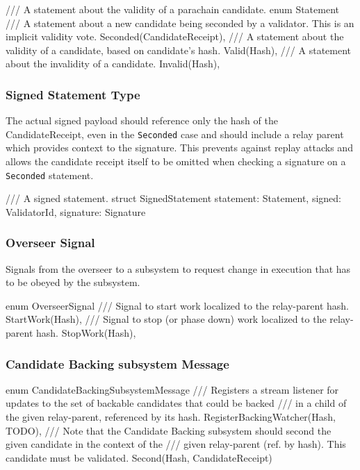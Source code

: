 \begin{verbnobox}[\small]
/// A statement about the validity of a parachain candidate.
enum Statement {
  /// A statement about a new candidate being seconded by a validator. This is an implicit validity vote.
  Seconded(CandidateReceipt),
  /// A statement about the validity of a candidate, based on candidate's hash.
  Valid(Hash),
  /// A statement about the invalidity of a candidate.
  Invalid(Hash),
}
\end{verbnobox}

\subsubsection{Signed Statement Type}

The actual signed payload should reference only the hash of the
CandidateReceipt, even in the \verb|Seconded| case and should include a relay parent
which provides context to the signature. This prevents against replay attacks
and allows the candidate receipt itself to be omitted when checking a signature
on a \verb|Seconded| statement.

\begin{verbnobox}[\small]
/// A signed statement.
struct SignedStatement {
  statement: Statement,
  signed: ValidatorId,
  signature: Signature
}
\end{verbnobox}

\subsubsection{Overseer Signal}

Signals from the overseer to a subsystem to request change in execution that has
to be obeyed by the subsystem.

\begin{verbnobox}
enum OverseerSignal {
  /// Signal to start work localized to the relay-parent hash.
  StartWork(Hash),
  /// Signal to stop (or phase down) work localized to the relay-parent hash.
  StopWork(Hash),
}
\end{verbnobox}

\subsubsection{Candidate Backing subsystem Message}

\begin{verbnobox}
enum CandidateBackingSubsystemMessage {
  /// Registers a stream listener for updates to the set of backable candidates that could be backed
  /// in a child of the given relay-parent, referenced by its hash.
  RegisterBackingWatcher(Hash, TODO),
  /// Note that the Candidate Backing subsystem should second the given candidate in the context of the
  /// given relay-parent (ref. by hash). This candidate must be validated.
  Second(Hash, CandidateReceipt)
}
\end{verbnobox}

